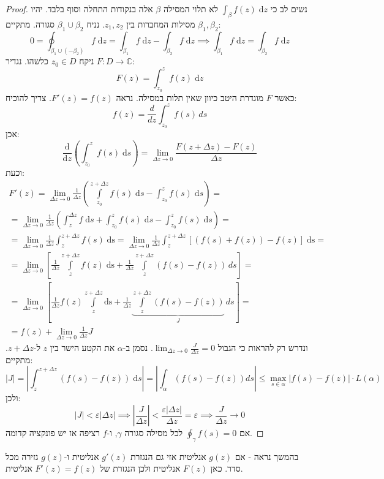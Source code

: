 \documentclass{tstextbook}
\begin{document}
\begin{proof}
נשים לב כי \(\int_{\beta}f(z)\;\mathrm{d}z\) לא תלוי המסילה \(\beta\) אלה בנקודות התחלה וסוף בלבד. יהיו \(\beta_{1},\beta_{2}\) מסילות המחברות בין \(z_{1},z_{2}\). נניח \(\beta_{1}\cup \beta_{2}\) סגורה. מתקיים:
$$0=\oint_{\beta_{1} \cup \left( -\beta_{2} \right)} f\;\mathrm{d}z=\int_{\beta_{1}}f\;\mathrm{d}z-\int_{\beta_{2}}f\;\mathrm{d}z\implies \int_{\beta_{1}}f\;\mathrm{d}z=\int_{\beta_{2}}f\;\mathrm{d}z$$
ניקח \(z_{0} \in D\) כלשהו. נגדיר \(F:D\to \mathbb{C}\):
$$F(z)=\int_{z_{0}}^z f(z)\;\mathrm{d}z$$
כאשר \(F\) מוגדרת היטב כיוון שאין תלות במסילה. נראה \(F'(z)=f(z)\). צריך להוכיח:
$$f(z)=\frac{d}{dz}\int_{z_{0}}^{z} f(s) \, ds $$
אכן:
$$\frac{\mathrm{d} }{\mathrm{d} z} \left( \int_{z_{0}}^z f(s)\;\mathrm{d}s \right)=\lim_{ \Delta z \to 0 }  \frac{F\left( z+\Delta z \right)-F(z)}{\Delta z}$$
וכעת:
\begin{gather*}F'(z)=\lim_{ \Delta z \to 0 } \frac{1}{\Delta z}\left( \int\limits_{z_{0}}^{z+\Delta z} f(s)\;\mathrm{d}s -\int_{z_{0}}^{z} f(s)\;\mathrm{d}s    \right)= \\=\lim_{ \Delta z \to 0 } \frac{1}{\Delta z}\left( \int_{z}^{\Delta z}  \!\!\!f\; \mathrm{d}s+ \int_{z_{0}}^{z} f(s)\;\mathrm{d}s -\int_{z_{0}}^{z} f(s)\;\mathrm{d}s    \right) = \\= \lim_{ \Delta z \to 0 } \frac{1}{\Delta z} \int_{z}^{z+\Delta z} f(s)\;\mathrm{ds}= \lim_{ \Delta z \to 0 } \frac{1}{\Delta z} \int_{z}^{z+\Delta z} [(f(s)+f(z))-f(z)]\;\mathrm{ds}= \\= \lim_{ \Delta z \to 0 } \left[ \frac{1}{\Delta z} \int\limits_{z}^{z+\Delta z} f(z)\;\mathrm{ds}+\frac{1}{\Delta z}\int\limits_{z}^{z+\Delta z} (f(s)-f(z))  \, ds \right] = \\= \lim_{ \Delta z \to 0 } \left[ \frac{1}{\Delta z} f(z)\int\limits_{z}^{z+\Delta z} \mathrm{ds}+\frac{1}{\Delta z}\underbrace{ \int\limits_{z}^{z+\Delta z} (f(s)-f(z))  }_{ J } \, ds \right] =    \\=f(z)+\lim_{ \Delta z \to 0 } \frac{1}{\Delta z}J
\end{gather*}
ונדרש רק להראות כי הגבול \(\lim_{ \Delta z \to 0 } \frac{J}{\Delta z}=0\). נסמן ב-\(\alpha\) את הקטע הישר בין \(z\) ל-\(z+\Delta z\). מתקיים:
$$\lvert J \rvert =\left\lvert  \int_{z}^{z+\Delta z}(f(s)-f(z))  \;\mathrm{d}s\right\rvert =\left\lvert  \int_{\alpha} (f(s)-f(z))ds \right\rvert \leq \max _{s \in \alpha}\lvert f(s)-f(z) \rvert \cdot L\left( \alpha \right)$$
ולכן:
$$\lvert J \rvert <\varepsilon \left\lvert  \Delta z  \right\rvert \implies \left\lvert  \frac{J}{\Delta z}  \right\rvert < \frac{\varepsilon \left\lvert  \Delta z  \right\rvert}{\Delta z}=\varepsilon\implies \frac{J}{\Delta z}\to 0$$
אם \(\oint_{\gamma}f(s)=0\) לכל מסילה סגורה \(\gamma\), ו-\(f\) רציפה אז יש פונקציה קדומה.

\end{proof}
\begin{remark}
בהמשך נראה - אם \(g(z)\) אנליטית אזי גם הנגזרת \(g'(z)\) אנליטית ו-\(g(z)\) גזירה מכל סדר. כאן \(F(z)\) אנליטית ולכן הנגזרת של \(F'(z)=f(z)\) אנליטית.

\end{remark}
\end{document}
